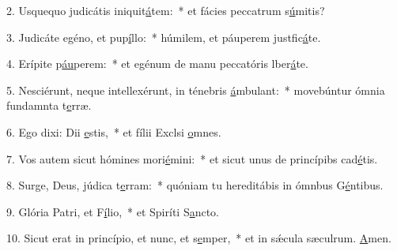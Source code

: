 2. Usquequo judicátis iniquit\uline{á}tem:~* et fácies peccatrum s\uline{ú}mitis?\par 
3. Judicáte egéno, et pup\uline{í}llo:~* húmilem, et páuperem justfic\uline{á}te.\par 
4. Erípite p\uline{áu}perem:~* et egénum de manu peccatóris lber\uline{á}te.\par 
5. Nesciérunt, neque intellexérunt, in ténebris \uline{á}mbulant:~* movebúntur ómnia fundamnta t\uline{e}rræ.\par 
6. Ego dixi: Dii \uline{e}stis,~* et fílii Exclsi \uline{o}mnes.\par 
7. Vos autem sicut hómines mori\uline{é}mini:~* et sicut unus de princípibs cad\uline{é}tis.\par 
8. Surge, Deus, júdica t\uline{e}rram:~* quóniam tu hereditábis in ómnbus G\uline{é}ntibus.\par 
9. Glória Patri, et F\uline{í}lio,~* et Spiríti S\uline{a}ncto.\par 
10. Sicut erat in princípio, et nunc, et s\uline{e}mper,~* et in sǽcula sæculrum. \uline{A}men.\par 

